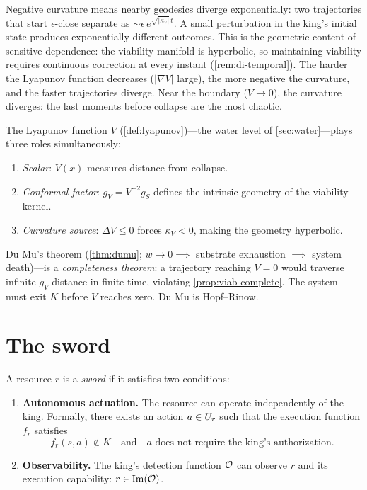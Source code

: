 \begin{remark}
\label{rem:viab-divergence}
Negative curvature means nearby geodesics diverge exponentially:
two trajectories that start $\epsilon$-close separate as
$\sim \epsilon\, e^{\sqrt{|\kappa_V|}\, t}$.  A small perturbation
in the king's initial state produces exponentially different
outcomes.  This is the geometric content of sensitive dependence:
the viability manifold is hyperbolic, so maintaining viability
requires continuous correction at every instant
(\cref{rem:di-temporal}).  The harder the Lyapunov function
decreases ($|\nabla V|$ large), the more negative the curvature,
and the faster trajectories diverge.  Near the boundary
($V \to 0$), the curvature diverges: the last moments before
collapse are the most chaotic.
\end{remark}

\begin{remark}\label{rem:water-metric}
The Lyapunov function $V$ (\cref{def:lyapunov})---the water level
of \cref{sec:water}---plays three roles simultaneously:
\begin{enumerate}[label=(\roman*)]
  \item \emph{Scalar}: $V(x)$ measures distance from collapse.
  \item \emph{Conformal factor}: $g_V = V^{-2} g_S$ defines the
  intrinsic geometry of the viability kernel.
  \item \emph{Curvature source}: $\Delta V \leq 0$ forces
  $\kappa_V < 0$, making the geometry hyperbolic.
\end{enumerate}
Du Mu's theorem (\cref{thm:dumu}; $w \to 0 \implies$ substrate
exhaustion $\implies$ system death)---is a
\emph{completeness theorem}: a trajectory reaching
$V = 0$ would traverse infinite $g_V$-distance in finite time,
violating \cref{prop:viab-complete}.  The system must exit $K$
before $V$ reaches zero.  Du Mu is Hopf--Rinow.
\end{remark}

\section{The sword}\label{sec:sword}

\begin{definition}[Sword]\label{def:sword}
A resource $r$ is a \emph{sword} if it satisfies two conditions:
\begin{enumerate}[label=(\arabic*)]
  \item \textbf{Autonomous actuation.} The resource can operate
  independently of the king. Formally, there exists an action
  $a \in U_r$ such that the execution function $f_r$ satisfies
  \[
    f_r(s, a) \notin K
    \quad\text{and}\quad
    a \text{ does not require the king's authorization.}
  \]
  \item \textbf{Observability.} The king's detection function $\mathcal{O}$
  can observe $r$ and its execution capability:
  $r \in \mathrm{Im}(\mathcal{O})$.
\end{enumerate}
\end{definition}

